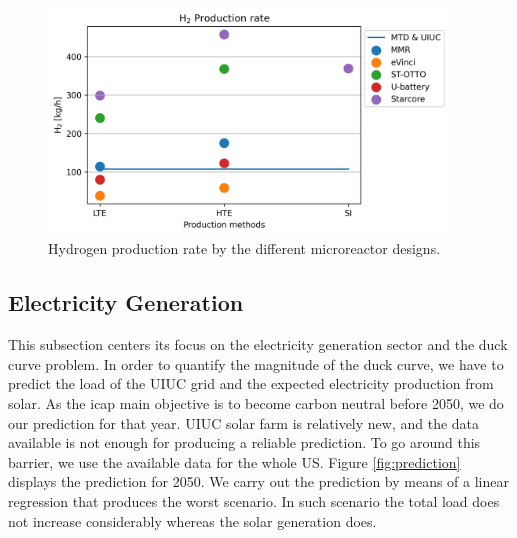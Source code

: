 \documentclass[11pt,letterpaper]{article}
\begin{document}
	\begin{figure}[htbp!]
	    \centering
		\includegraphics[height=6.0cm]{figures/reactors-by-hour1}
		\hfill
		\caption{Hydrogen production rate by the different microreactor designs.}
		\label{fig:hydro-micro}
	\end{figure}

\subsection{Electricity Generation}

This subsection centers its focus on the electricity generation sector and the duck curve problem.
In order to quantify the magnitude of the duck curve, we have to predict the load of the \gls{UIUC} grid and the expected electricity production from solar.
As the \gls{icap} main objective is to become carbon neutral before 2050, we do our prediction for that year.
\gls{UIUC} solar farm is relatively new, and the data available is not enough for producing a reliable prediction.
To go around this barrier, we use the available data for the whole \gls{US}.
Figure \ref{fig:prediction} displays the prediction for 2050.
We carry out the prediction by means of a linear regression that produces the worst scenario.
In such scenario the total load does not increase considerably whereas the solar generation does.
\end{document}
